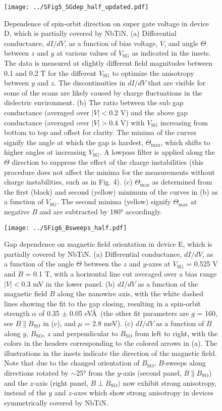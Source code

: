 \documentclass[prl,singlecolumn,notitlepage,secnumroman,superscriptaddress,nobibnotes,graphicx,amsmath,amssymb]{revtex4-2}
\begin{document}
\begin{figure}[p!]
\centering
\texttt{[image: ../SFig5\_SGdep\_half\_updated.pdf]}
\caption{\label{fig:SGdep}
	Dependence of spin-orbit direction on super gate voltage in device D, which is partially covered by NbTiN. 
	(a) Differential conductance, $dI/dV$, as a function of bias voltage, $V$, and angle $\Theta$ between $z$ and $y$ at various values of $V_{\mathrm{SG}}$ as indicated in the insets. The data is measured at slightly different field magnitudes between 0.1 and 0.2 T for the different $V_{\mathrm{SG}}$ to optimize the anisotropy between $y$ and $z$. The discontinuities in $dI/dV$ that are visible for some of the scans are likely caused by charge fluctuations in the dielectric environment. (b) The ratio between the sub gap conductance (averaged over $|V| < 0.2$ V) and the above gap conductance (averaged over $|V| > 0.4$ V) with $V_{\mathrm{SG}}$ increasing from bottom to top and offset for clarity. The minima of the curves signify the angle at which the gap is hardest, $\Theta_{\mathrm{max}}$, which shifts to higher angles at increasing $V_{\mathrm{SG}}$. A lowpass filter is applied along the $\Theta$ direction to suppress the effect of the charge instabilities (this procedure does not affect the minima for the measurements without charge instabilities, such as in Fig. 4). (c) $\Theta_{\mathrm{max}}$ as determined from the first (black) and second (yellow) minimum of the curves in (b) as a function of $V_{\mathrm{SG}}$. The second minima (yellow) signify $\Theta_{\mathrm{max}}$ at negative $B$ and are subtracted by \ang{180} accordingly.
}
\end{figure}

\begin{figure}[p!]
\centering
\texttt{[image: ../SFig6\_Bsweeps\_half.pdf]}
\caption{\label{fig:BsweepsHalf}
	Gap dependence on magnetic field orientation in device E, which is partially covered by NbTiN.
	(a) Differential conductance, $dI/dV$, as a function of the angle $\Theta$ between the $z$ and $y$-axes at $V_{\mathrm{SG}}$ = 0.525 V and $B$ = 0.1 T, with a horizontal line cut averaged over a bias range $|V| < 0.3$ mV in the lower panel. (b) $dI/dV$ as a function of the magnetic field $B$ along the nanowire axis, with the white dashed lines showing the fit to the gap closing, resulting in a spin-orbit strength $\alpha$ of 0.35 $\pm$ 0.05 eV\AA\ (the other fit parameters are $g$ = 160, see $B \parallel B_{\mathrm{SO}}$ in (c), and $\mu$ = 2.8 meV). (c) $dI/dV$ as a function of $B$ along $y$, $B_{\mathrm{SO}}$, $z$ and perpendicular to $B_{\mathrm{SO}}$ from left to right, with the colors in the headers corresponding to the colored arrows in (a). The illustrations in the insets indicate the direction of the magnetic field. Note that due to the changed orientation of $B_{\mathrm{SO}}$, $B$-sweeps along directions rotated by $\sim$\ang{25} from the $y$-axis (second panel, $B \parallel B_{\mathrm{SO}}$) and the $z$-axis (right panel, $B \perp B_{\mathrm{SO}})$  now exhibit strong anisotropy, instead of the $y$ and $z$-axes which show strong anisotropy in devices symmetrically covered by NbTiN. 
}
\end{figure}

\clearpage

\end{document}
